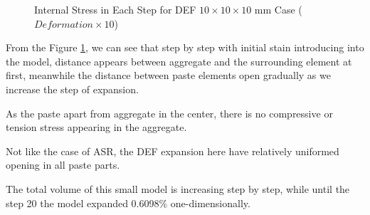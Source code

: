 \begin{figure}[ht!]
  \caption{Internal Stress in Each Step for DEF $10 \times 10 \times 10$ mm Case ($Deformation \times 10$)}
  \label{fig:DEF_Small_DEF_CR}
  \end{figure}

From the Figure \ref{fig:DEF_Small_DEF_CR}, we can see that step by step with initial stain introducing into the model, distance appears between aggregate and the surrounding element at first, meanwhile the distance between paste elements open gradually as we increase the step of expansion.

As the paste apart from aggregate in the center, there is no compressive or tension stress appearing in the aggregate.

Not like the case of ASR, the DEF expansion here have relatively uniformed opening in all paste parts.

The total volume of this small model is increasing step by step, while until the step 20 the model expanded 0.6098\% one-dimensionally.

